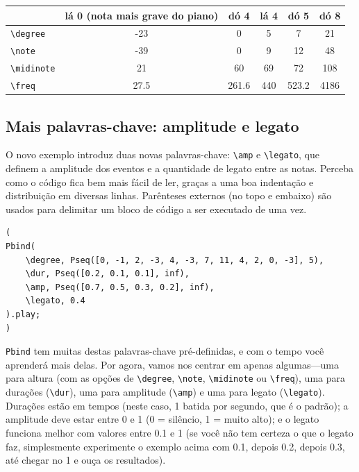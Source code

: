 \bigskip
{}
\bigskip


\begin{tabular}{|l|c|c|c|c|c|}
\hline 
  & \textbf{lá 0 (nota mais grave do piano)} & \textbf{dó 4} & \textbf{lá 4} & \textbf{dó 5} & \textbf{dó 8} \\ 
\hline 
\texttt{\textbackslash degree} & -23 & 0 & 5 & 7 & 21 \\
\hline
\texttt{\textbackslash note} & -39 & 0 & 9 & 12 & 48 \\
\hline
\texttt{\textbackslash midinote} & 21 & 60 & 69 & 72 & 108 \\
\hline
\texttt{\textbackslash freq} & 27.5 & 261.6 & 440 & 523.2 & 4186 \\
\hline
\end{tabular}
\bigskip


\subsection{Mais palavras-chave: amplitude e legato}

O novo exemplo introduz duas novas palavras-chave: \texttt{\textbackslash amp} e \texttt{\textbackslash legato}, que definem a amplitude dos eventos e a quantidade de legato entre as notas. Perceba como o código fica bem mais fácil de ler, graças a uma boa indentação e distribuição em diversas linhas. Parênteses externos (no topo e embaixo) são usados para delimitar um bloco de código a ser executado de uma vez.

 
\begin{lstlisting}[style=SuperCollider-IDE, basicstyle=\scttfamily\footnotesize]
(
Pbind(
	\degree, Pseq([0, -1, 2, -3, 4, -3, 7, 11, 4, 2, 0, -3], 5),
	\dur, Pseq([0.2, 0.1, 0.1], inf),
	\amp, Pseq([0.7, 0.5, 0.3, 0.2], inf),
	\legato, 0.4
).play;
)
\end{lstlisting}
 

\texttt{Pbind} tem muitas destas palavras-chave pré-definidas, e com o tempo você aprenderá mais delas. Por agora, vamos nos centrar em apenas algumas---uma para altura (com as opções de \texttt{\textbackslash degree}, \texttt{\textbackslash note}, \texttt{\textbackslash midinote} ou \texttt{\textbackslash freq}), uma para durações (\texttt{\textbackslash dur}), uma para amplitude (\texttt{\textbackslash amp}) e uma para legato (\texttt{\textbackslash legato}). Durações estão em tempos (neste caso, 1 batida por segundo, que é o padrão); a amplitude deve estar entre 0 e 1 (0 = silêncio, 1 = muito alto); e o legato funciona melhor com valores entre 0.1 e 1 (se você não tem certeza o que o legato faz, simplesmente experimente o exemplo acima com 0.1, depois 0.2, depois 0.3, até chegar no 1 e ouça os resultados).

